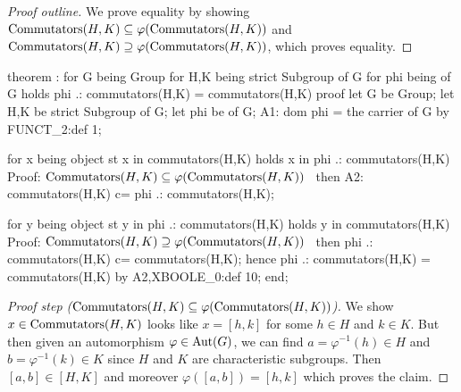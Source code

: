 \begin{proof}[Proof outline]
We prove equality by showing ${\rm Commutators}(H,K)\subset\varphi({\rm Commutators}(H,K))$
and ${\rm Commutators}(H,K)\supset\varphi({\rm Commutators}(H,K))$,
which proves equality.
\end{proof}

\nwenddocs{}\endmoddef\nwstartdeflinemarkup{}\nwenddeflinemarkup
theorem :
  for G being Group
  for H,K being strict  Subgroup of G
  for phi being  of G
  holds phi .: commutators(H,K) = commutators(H,K)
proof
  let G be Group;
  let H,K be strict  Subgroup of G;
  let phi be  of G;
  A1: dom phi = the carrier of G by FUNCT_2:def 1;

  for x being object st x in commutators(H,K) holds x in phi .: commutators(H,K)
  \LA{}Proof: ${\rm Commutators}(H,K)\subset\varphi({\rm Commutators}(H,K))$~{\nwtagstyle{}}\RA{}
  then A2: commutators(H,K) c= phi .: commutators(H,K);

  for y being object st y in phi .: commutators(H,K) holds y in commutators(H,K)
  \LA{}Proof: ${\rm Commutators}(H,K)\supset\varphi({\rm Commutators}(H,K))$~{\nwtagstyle{}}\RA{}
  then phi .: commutators(H,K) c= commutators(H,K);
  hence phi .: commutators(H,K) = commutators(H,K) by A2,XBOOLE_0:def 10;
end;
\eatline
{}\nwendcode{}\nwdocspar
\begin{proof}[Proof step (${\rm Commutators}(H,K)\subset\varphi({\rm Commutators}(H,K))$)]
We show $x\in{\rm Commutators}(H,K)$ looks like $x=[h,k]$ for some $h\in H$
and $k\in K$. But then given an automorphism $\varphi\in\Aut(G)$, we can
find $a=\varphi^{-1}(h)\in H$ and $b=\varphi^{-1}(k)\in K$ since $H$ and $K$ are
characteristic subgroups. Then $[a,b]\in[H,K]$ and moreover
$\varphi([a,b])=[h,k]$ which proves the claim.
\end{proof}

